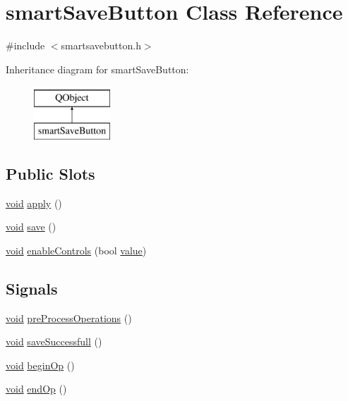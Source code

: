 \hypertarget{classsmart_save_button}{\section{smart\-Save\-Button Class Reference}
\label{classsmart_save_button}
}


{\ttfamily \#include $<$smartsavebutton.\-h$>$}

Inheritance diagram for smart\-Save\-Button\-:\begin{figure}[H]
\begin{center}
\leavevmode
\includegraphics[height=2.000000cm]{classsmart_save_button}
\end{center}
\end{figure}
\subsection*{Public Slots}
\begin{DoxyCompactItemize}
\item 
\hyperlink{group___u_a_v_objects_plugin_ga444cf2ff3f0ecbe028adce838d373f5c}{void} \hyperlink{group___u_a_v_object_widget_utils_ga453b1bbd8b56fa6af4f362b00221b265}{apply} ()
\item 
\hyperlink{group___u_a_v_objects_plugin_ga444cf2ff3f0ecbe028adce838d373f5c}{void} \hyperlink{group___u_a_v_object_widget_utils_gad0e6541ace97075634254ba3b1cc9bf9}{save} ()
\item 
\hyperlink{group___u_a_v_objects_plugin_ga444cf2ff3f0ecbe028adce838d373f5c}{void} \hyperlink{group___u_a_v_object_widget_utils_ga56d88dfdb1b735dbaf2c957e32fca452}{enable\-Controls} (bool \hyperlink{glext_8h_aa0e2e9cea7f208d28acda0480144beb0}{value})
\end{DoxyCompactItemize}
\subsection*{Signals}
\begin{DoxyCompactItemize}
\item 
\hyperlink{group___u_a_v_objects_plugin_ga444cf2ff3f0ecbe028adce838d373f5c}{void} \hyperlink{group___u_a_v_object_widget_utils_ga986b48d4e0086adbba03b2da6178524b}{pre\-Process\-Operations} ()
\item 
\hyperlink{group___u_a_v_objects_plugin_ga444cf2ff3f0ecbe028adce838d373f5c}{void} \hyperlink{group___u_a_v_object_widget_utils_gafe5d25f2387fdd74204dec872a062f3e}{save\-Successfull} ()
\item 
\hyperlink{group___u_a_v_objects_plugin_ga444cf2ff3f0ecbe028adce838d373f5c}{void} \hyperlink{group___u_a_v_object_widget_utils_ga84a531cfeea77f9e892321017dbcd705}{begin\-Op} ()
\item 
\hyperlink{group___u_a_v_objects_plugin_ga444cf2ff3f0ecbe028adce838d373f5c}{void} \hyperlink{group___u_a_v_object_widget_utils_ga2e135b9ad9a743cd1b8b358069ffaf3e}{end\-Op} ()
\end{DoxyCompactItemize}
